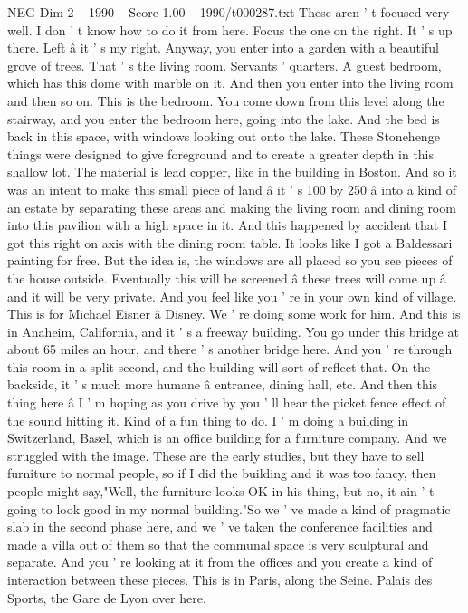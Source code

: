 \begin{textsample}{NEG Dim 2 – 1990 – Score 1.00 – 1990/t000287.txt}
These aren ' t focused very well.
I don ' t know how to do it from here.
Focus the one on the right.
It ' s up there.
Left â it ' s my right.
Anyway, you enter into a garden with a beautiful grove of trees.
That ' s the living room.
Servants ' quarters.
A guest bedroom, which has this dome with marble on it.
And then you enter into the living room and then so on.
This is the bedroom.
You come down from this level along the stairway, and you enter the bedroom here, going into the lake.
And the bed is back in this space, with windows looking out onto the lake.
These Stonehenge things were designed to give foreground and to create a greater depth in this shallow lot.
The material is lead copper, like in the building in Boston.
And so it was an intent to make this small piece of land â it ' s 100 by 250 â into a kind of an estate by separating these areas and making the living room and dining room into this pavilion with a high space in it.
And this happened by accident that I got this right on axis with the dining room table.
It looks like I got a Baldessari painting for free.
But the idea is, the windows are all placed so you see pieces of the house outside.
Eventually this will be screened â these trees will come up â and it will be very private.
And you feel like you ' re in your own kind of village.
This is for Michael Eisner â Disney.
We ' re doing some work for him.
And this is in Anaheim, California, and it ' s a freeway building.
You go under this bridge at about 65 miles an hour, and there ' s another bridge here.
And you ' re through this room in a split second, and the building will sort of reflect that.
On the backside, it ' s much more humane â entrance, dining hall, etc.
And then this thing here â I ' m hoping as you drive by you ' ll hear the picket fence effect of the sound hitting it.
Kind of a fun thing to do.
I ' m doing a building in Switzerland, Basel, which is an office building for a furniture company.
And we struggled with the image.
These are the early studies, but they have to sell furniture to normal people, so if I did the building and it was too fancy, then people might say,"Well, the furniture looks OK in his thing, but no, it ain ' t going to look good in my normal building."So we ' ve made a kind of pragmatic slab in the second phase here, and we ' ve taken the conference facilities and made a villa out of them so that the communal space is very sculptural and separate.
And you ' re looking at it from the offices and you create a kind of interaction between these pieces.
This is in Paris, along the Seine.
Palais des Sports, the Gare de Lyon over here.

\end{textsample}
